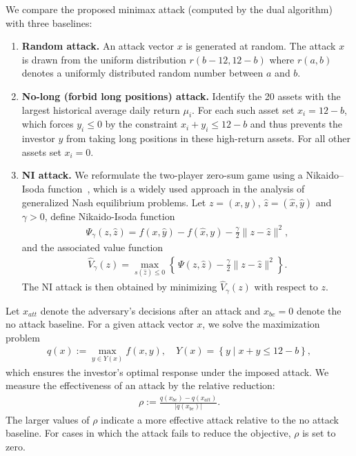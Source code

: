 \documentclass{article}
\begin{document}
	We compare the proposed minimax attack (computed by the dual algorithm) with three baselines:
	\begin{enumerate}
		\item \textbf{Random attack.}  An attack vector $x$ is generated at random. The attack $x$ is drawn from the uniform distribution $r(b-12, 12-b)$ where $r(a, b)$ denotes a uniformly distributed random number between $a$ and $b$.
		
		\item \textbf{No-long (forbid long positions) attack.} Identify the 20 assets with the largest historical average daily return $\mu_{i}$. For each such asset set $x_{i} = 12-b$, which forces $y_{i}\le 0$ by the constraint $x_{i}+y_{i}\le 12-b$ and thus prevents the investor $y$ from taking long positions in these high-return assets. For all other assets set $x_{i}=0$.
		
		\item \textbf{NI attack.} We reformulate the two-player zero-sum game using a Nikaido–Isoda function~\cite{vonheusingerOptimizationReformulationsGeneralized2009}, which is a widely used approach in the analysis of generalized Nash equilibrium problems. Let $z=(x,y)$, $\hat z=(\hat x,\hat y)$ and $\gamma > 0$, define Nikaido-Isoda function
		\begin{align*}
			\Psi_{\gamma}(z,\hat z)=f(x,\hat y)-f(\hat x,y) - \frac{\gamma}{2}\|z - \hat{z}\|^{2},
		\end{align*}
		and the associated value function
		\begin{align*}
			\hat{V}_{\gamma}(z)=\max_{s(\hat z)\le 0}\left\lbrace\,\Psi(z,\hat z)-\frac{\gamma}{2}\|z-\hat z\|^{2}\right\rbrace.
		\end{align*}
		The NI attack is then obtained by minimizing $\hat{V}_{\gamma}(z)$ with respect to $z$.
	\end{enumerate}
	
	Let $x_{att}$ denote the adversary's decisions after an attack and $x_{be} = 0$ denote the no attack baseline. For a given attack vector $x$, we solve the maximization problem
	\begin{align*}
		q(x):=\max_{y \in Y(x)} f(x,y),\quad Y(x) = \left\lbrace y \mid x + y \leq 12-b \right\rbrace,
	\end{align*}
	which ensures the investor's optimal response under the imposed attack. We measure the effectiveness of an attack by the relative reduction:
	\begin{align*}
		\rho := \frac{q(x_{be})-q(x_{att})}{|q(x_{be})|}.
	\end{align*}
	The larger values of $\rho$ indicate a more effective attack relative to the no attack baseline. For cases in which the attack fails to reduce the objective, $\rho$ is set to zero.
	
\end{document}
